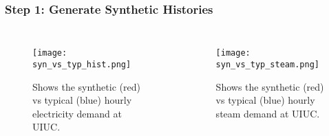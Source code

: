 \begin{frame}
  \frametitle{Step 1: Generate Synthetic Histories}
  \begin{columns}
    \column[t]{5cm}
    \begin{figure}
      \centering
      \texttt{[image: syn\_vs\_typ\_hist.png]}
      \caption{Shows the synthetic (red) vs typical (blue) hourly electricity demand at UIUC.}
      \label{fig:syndemand}
    \end{figure}
    \column[t]{5cm}
    \begin{figure}
      \centering
      \texttt{[image: syn\_vs\_typ\_steam.png]}
      \caption{Shows the synthetic (red) vs typical (blue) hourly steam demand at UIUC.}
      \label{fig:synsteam}
    \end{figure}
  \end{columns}
\end{frame}
